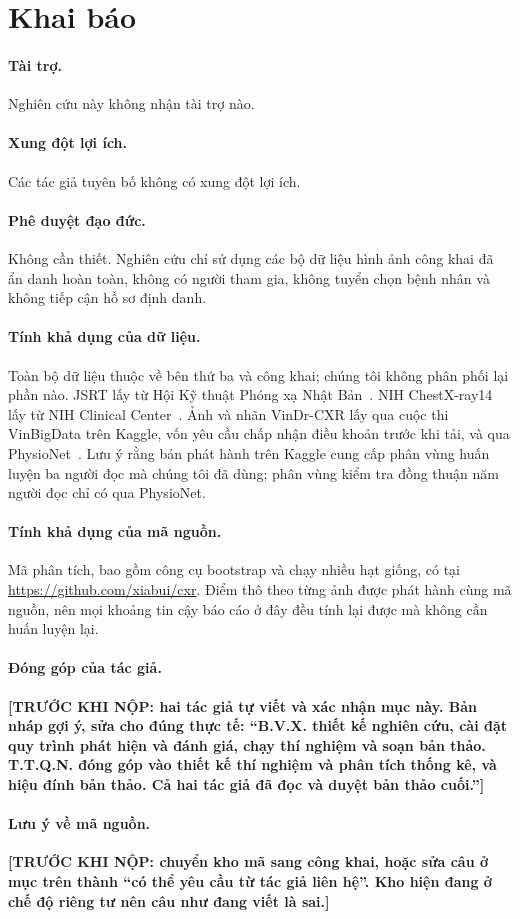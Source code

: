 \documentclass[12pt,a4paper]{article}
\begin{document}
\section*{Khai báo}

\paragraph{Tài trợ.} Nghiên cứu này không nhận tài trợ nào.

\paragraph{Xung đột lợi ích.} Các tác giả tuyên bố không có xung đột lợi ích.

\paragraph{Phê duyệt đạo đức.} Không cần thiết. Nghiên cứu chỉ sử dụng các bộ dữ
liệu hình ảnh công khai đã ẩn danh hoàn toàn, không có người tham gia, không
tuyển chọn bệnh nhân và không tiếp cận hồ sơ định danh.

\paragraph{Tính khả dụng của dữ liệu.} Toàn bộ dữ liệu thuộc về bên thứ ba và
công khai; chúng tôi không phân phối lại phần nào. JSRT lấy từ Hội Kỹ thuật Phóng
xạ Nhật Bản~\cite{shiraishi2000jsrt}. NIH ChestX-ray14 lấy từ NIH Clinical
Center~\cite{wang2017chestxray}. Ảnh và nhãn VinDr-CXR lấy qua cuộc thi VinBigData
trên Kaggle, vốn yêu cầu chấp nhận điều khoản trước khi tải, và qua
PhysioNet~\cite{nguyen2022vindr}. Lưu ý rằng bản phát hành trên Kaggle cung cấp
phân vùng huấn luyện ba người đọc mà chúng tôi đã dùng; phân vùng kiểm tra đồng
thuận năm người đọc chỉ có qua PhysioNet.

\paragraph{Tính khả dụng của mã nguồn.} Mã phân tích, bao gồm công cụ bootstrap
và chạy nhiều hạt giống, có tại \url{https://github.com/xiabui/cxr}. Điểm thô
theo từng ảnh được phát hành cùng mã nguồn, nên mọi khoảng tin cậy báo cáo ở đây
đều tính lại được mà không cần huấn luyện lại.

\paragraph{Đóng góp của tác giả.}
\textbf{[TRƯỚC KHI NỘP: hai tác giả tự viết và xác nhận mục này. Bản nháp gợi ý,
sửa cho đúng thực tế: ``B.V.X. thiết kế nghiên cứu, cài đặt quy trình phát hiện
và đánh giá, chạy thí nghiệm và soạn bản thảo. T.T.Q.N. đóng góp vào thiết kế
thí nghiệm và phân tích thống kê, và hiệu đính bản thảo. Cả hai tác giả đã đọc
và duyệt bản thảo cuối.'']}

\paragraph{Lưu ý về mã nguồn.}
\textbf{[TRƯỚC KHI NỘP: chuyển kho mã sang công khai, hoặc sửa câu ở mục trên
thành ``có thể yêu cầu từ tác giả liên hệ''. Kho hiện đang ở chế độ riêng tư nên
câu như đang viết là sai.]}



\end{document}
